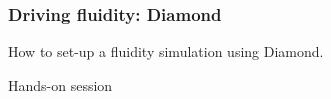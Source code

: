 \documentclass[12pt]{beamer}
\begin{document}
\begin{frame}
    \frametitle{Driving fluidity: Diamond}
How to set-up a fluidity simulation using Diamond.

Hands-on session
\end{frame}
\end{document}
